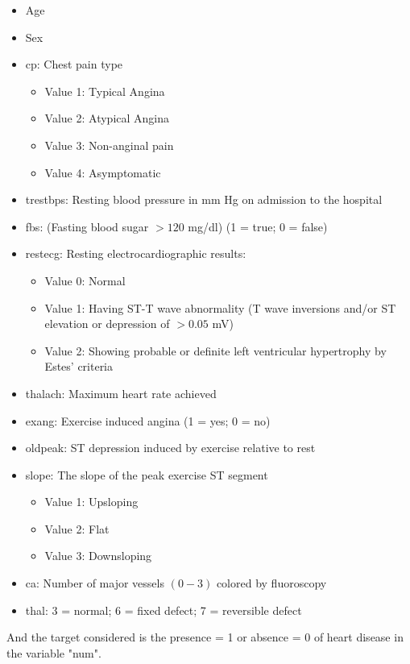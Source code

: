 \documentclass[12pt]{article}
\begin{document}
\begin{itemize}
    \item Age
    \item Sex
    \item cp: Chest pain type
    \begin{itemize}
        \item Value 1: Typical Angina
        \item Value 2: Atypical Angina
        \item Value 3: Non-anginal pain
        \item Value 4: Asymptomatic
    \end{itemize}
    \item trestbps: Resting blood pressure in mm Hg on admission to the hospital
    \item fbs: (Fasting blood sugar $> 120$ mg/dl) (1 = true; 0 = false)
    \item restecg: Resting electrocardiographic results:
    \begin{itemize}
        \item Value 0: Normal
        \item Value 1: Having ST-T wave abnormality (T wave inversions and/or ST elevation or depression of $> 0.05$ mV)
        \item Value 2: Showing probable or definite left ventricular hypertrophy by Estes' criteria
    \end{itemize}
    \item thalach: Maximum heart rate achieved
    \item exang: Exercise induced angina (1 = yes; 0 = no)
    \item oldpeak: ST depression induced by exercise relative to rest
    \item slope: The slope of the peak exercise ST segment
    \begin{itemize}
        \item Value 1: Upsloping
        \item Value 2: Flat
        \item Value 3: Downsloping
    \end{itemize}
    \item ca: Number of major vessels $(0-3)$ colored by fluoroscopy
    \item thal: 3 = normal; 6 = fixed defect; 7 = reversible defect
\end{itemize}

And the target considered is the presence = 1 or absence = 0 of heart disease in the variable "num".
\end{document}
